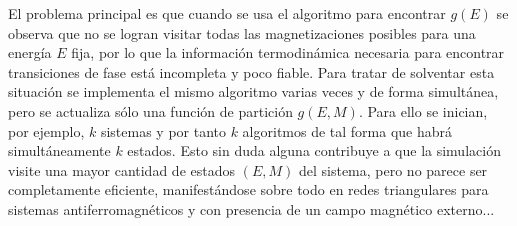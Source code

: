 \documentclass[12pt]{book}
\begin{document}
El problema principal es que cuando se usa el algoritmo para encontrar $g(E)$ se observa que no se logran visitar todas las magnetizaciones posibles para una energía $E$ fija, por lo que la información termodinámica necesaria para encontrar transiciones de fase está incompleta y poco fiable. 
Para tratar de solventar esta situación se implementa el mismo algoritmo varias veces y de forma simultánea, pero se actualiza sólo una función de partición $g(E,M)$. Para ello se inician, por ejemplo, $k$ sistemas y por tanto $k$ algoritmos de tal forma que habrá simultáneamente $k$ estados. Esto sin duda alguna contribuye a que la simulación visite una mayor cantidad de estados $(E,M)$ del sistema, pero no parece ser completamente eficiente, manifestándose sobre todo en redes triangulares para sistemas antiferromagnéticos y con presencia de un campo magnético externo...
\end{document}
